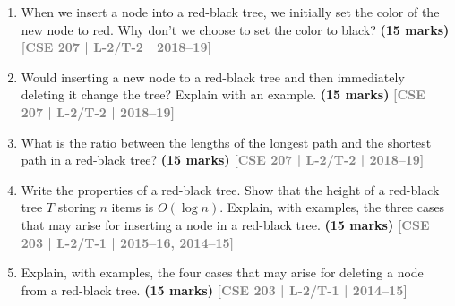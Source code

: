 \documentclass[12pt]{article}
\newcommand{\yr}[1]{\hfill\textcolor{gray}{\small\textbf{[#1]}}}
\newcommand{\mk}[1]{\textcolor{orange!70!black}{\small\textbf{(#1 marks)}}}
\begin{document}
\begin{enumerate}
\begin{center}
\end{center}
\mk{15} \yr{CSE 207 | L-2/T-2 | 2019--20, 2017--18}


\item When we insert a node into a red-black tree, we initially set the color of the new node to red. Why don't we choose to set the color to black?
\mk{15} \yr{CSE 207 | L-2/T-2 | 2018--19}


\item Would inserting a new node to a red-black tree and then immediately deleting it change the tree? Explain with an example.
\mk{15} \yr{CSE 207 | L-2/T-2 | 2018--19}


\item What is the ratio between the lengths of the longest path and the shortest path in a red-black tree?
\mk{15} \yr{CSE 207 | L-2/T-2 | 2018--19}



\item Write the properties of a red-black tree. Show that the height of a red-black tree $T$ storing $n$ items is $O(\log n)$. Explain, with examples, the three cases that may arise for inserting a node in a red-black tree. \mk{15}
\yr{CSE 203 | L-2/T-1 | 2015--16, 2014--15}


\item Explain, with examples, the four cases that may arise for deleting a node from a red-black tree. \mk{15}
\yr{CSE 203 | L-2/T-1 | 2014--15}



\end{enumerate}
\end{document}
